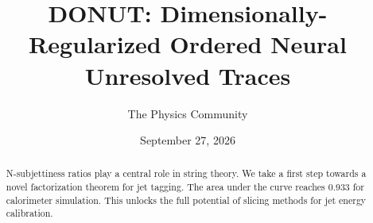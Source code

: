 \documentclass[11pt]{article}
\title{DONUT: Dimensionally-Regularized Ordered Neural Unresolved Traces}
\author{The Physics Community}
\date{September 27, 2026}
\begin{document}
\maketitle
\begin{abstract}
N-subjettiness ratios play a central role in string theory. We take a
first step towards a novel factorization theorem for jet tagging. The
area under the curve reaches 0.933 for calorimeter simulation. This
unlocks the full potential of slicing methods for jet energy
calibration.
\end{abstract}
\tableofcontents





\nocite{*}


\end{document}
